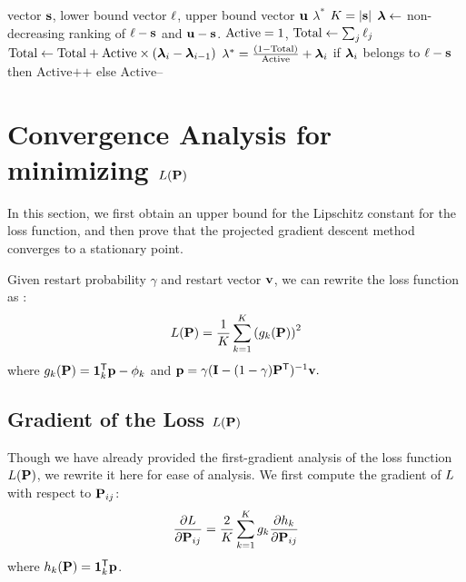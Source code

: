 \begin{algorithm}[t]	\caption{\label{alg:root_finding}\searchlambda: find the optimal dual variable}
	\begin{algorithmic}[1]
		\REQUIRE vector $\mathbf{{s}}$, lower bound vector $\mathbf{{\ell}}$, upper bound vector $\mathbf{{u}}$
		\ENSURE $\lambda^{*}$
            \STATE $K = |\mathbf{{s}}|$
            \STATE $\boldsymbol{\lambda} \gets$ non-decreasing ranking of $\mathbf{{\ell}} - \mathbf{{s}}$ and $\mathbf{{u}}-\mathbf{{s}}$.
            \STATE $\text{Active} = 1$, $\text{Total} \gets \sum_j \mathbf{{\ell}}_j$
            \STATE $\text{Total} \gets \text{Total} + \text{Active} \times (\boldsymbol{\lambda}_i - \boldsymbol{\lambda}_{i-1})$
            \RETURN $\lambda^{*} =  \frac{(1-\text{Total})}{\text{Active}} + \boldsymbol{\lambda}_i$
            \ELSE
            \STATE if $\boldsymbol{\lambda}_i$ belongs to $\mathbf{{\ell}} - \mathbf{{s}}$ then $\text{Active++}$ else $\text{Active}\texttt{--}$
            \ENDIF
            \ENDFOR
	\end{algorithmic}
\end{algorithm}










\section{Convergence Analysis for minimizing $L(\mathbf{{P}})$}
\label{section:convergence_L}
In this section, we first obtain an upper bound for the Lipschitz constant for the loss function, and then prove that the projected gradient descent method converges to a stationary point.

Given restart probability $\gamma$ and restart vector $\mathbf{{v}}$, we can rewrite the loss function as :
\begin{equation*}
    L(\mathbf{{P}}) = \frac{1}{K} \sum_{k=1}^K \left( g_k(\mathbf{{P}}) \right)^2
\end{equation*}
where $g_k(\mathbf{{P}}) = \mathbf{{1}}_{k}^{\mathsf{T}} \mathbf{{p}} - \phi_k$ and $\mathbf{{p}} = \gamma (\mathbf{{I}} - (1-\gamma) \mathbf{{P}}^{\mathsf{T}})^{-1} \mathbf{{v}}.$


\subsection{Gradient of the Loss $L(\mathbf{{P}})$}

Though we have already provided the first-gradient analysis of the loss function $L(\mathbf{{P}})$, we rewrite it here for ease of analysis. We first compute the gradient of $L$ with respect to $\mathbf{{P}}_{ij}$:
\begin{equation*}
    \frac{\partial L}{\partial \mathbf{{P}}_{ij}}
= \frac{2}{K} \sum_{k=1}^K g_k \frac{\partial h_k}{\partial \mathbf{{P}}_{ij}}
\end{equation*}
where $ h_k(\mathbf{{P}}) = \mathbf{{1}}_{k}^{\mathsf{T}} \mathbf{{p}} $.

